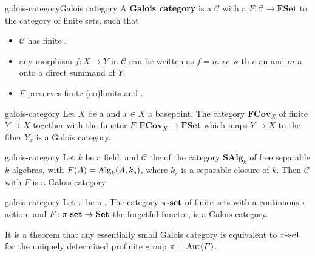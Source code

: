 \begin{topic}{galois-category}{Galois category}
    A \textbf{Galois category} is a  $\mathcal{C}$ with a  $F \colon \mathcal{C} \to \textbf{FSet}$ to the category of finite sets, such that
    \begin{itemize}
        \item $\mathcal{C}$ has finite ,
        \item any morphism $f \colon X \to Y$ in $\mathcal{C}$ can be written as $f = m \circ e$ with $e$ an  and $m$ a  onto a direct summand of $Y$,
        \item $F$ preserves finite (co)limits and .
    \end{itemize}
\end{topic}

\begin{example}{galois-category}
    Let $X$ be a   and $x \in X$ a basepoint. The category $\textbf{FCov}_X$ of finite  $Y \to X$ together with the functor $F \colon \textbf{FCov}_X \to \textbf{FSet}$ which maps $Y \to X$ to the fiber $Y_x$ is a Galois category.
\end{example}

\begin{example}{galois-category}
    Let $k$ be a field, and $\mathcal{C}$ the  of the category $\textbf{SAlg}_k$ of free separable $k$-algebras, with $F(A) = \textup{Alg}_k(A, k_s)$, where $k_s$ is a separable closure of $k$. Then $\mathcal{C}$ with $F$ is a Galois category.
\end{example}

\begin{example}{galois-category}
    Let $\pi$ be a . The category $\pi\textup{-}\textbf{set}$ of finite sets with a continuous $\pi$-action, and $F \colon \pi\textup{-}\textbf{set} \to \textbf{Set}$ the forgetful functor, is a Galois category.
    
    It is a theorem that any essentially small Galois category is equivalent to $\pi\textup{-}\textbf{set}$ for the uniquely determined profinite group $\pi = \textup{Aut}(F)$.
\end{example}

